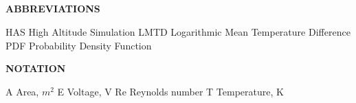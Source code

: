 \documentclass[twoside,a4paper,openright]{report} %
\begin{document}
\mbox{~}

\tableofcontents %
\mbox{~}
\newpage
\listoffigures

\mbox{~}
\newpage
\listoftables
\mbox{~}

\thispagestyle{empty} 

\iffalse

\begin{center}
	\textbf{ABBREVIATIONS} 
\end{center}
HAS \hspace{.5cm} High Altitude Simulation \newline
LMTD \hspace{.3cm}Logarithmic Mean Temperature Difference \newline
PDF \hspace{.5cm} Probability Density Function\newline
\vspace{2cm}
\begin{center}
	\textbf{NOTATION} 
\end{center}
A Area, $m^2$ \newline
E Voltage, V\newline
Re Reynolds number\newline
T Temperature, K\newline
\thispagestyle{empty}

% 
\end{document}
